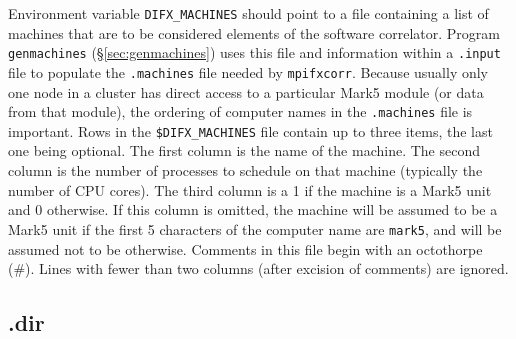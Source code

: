 Environment variable {\tt DIFX\_MACHINES} should point to a file containing a list of machines that are to be considered elements of the software correlator.
Program {\tt genmachines} (\S\ref{sec:genmachines}) uses this file and information within a {\tt .input} file to populate the {\tt .machines} file needed by {\tt mpifxcorr}.
Because usually only one node in a cluster has direct access to a particular Mark5 module (or data from that module), the ordering of computer names in the {\tt .machines} file is important.
Rows in the {\tt \$DIFX\_MACHINES} file contain up to three items, the last one being optional.
The first column is the name of the machine.
The second column is the number of processes to schedule on that machine (typically the number of CPU cores).
The third column is a 1 if the machine is a Mark5 unit and 0 otherwise.
If this column is omitted, the machine will be assumed to be a Mark5 unit if the first 5 characters of the computer name are {\tt mark5}, and will be assumed not to be otherwise.
Comments in this file begin with an octothorpe (\#).
Lines with fewer than two columns (after excision of comments) are ignored.








\subsection{.dir} \label{sec:dir}

